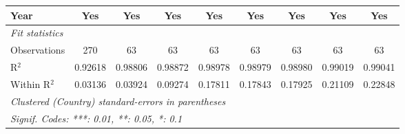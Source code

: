 \begin{table}[htbp]
\begin{tabular}{lcccccccc}
      Year                                                      & Yes             & Yes      & Yes      & Yes            & Yes            & Yes            & Yes            & Yes\\  
      \midrule
      \emph{Fit statistics}\\
      Observations                                              & 270             & 63       & 63       & 63             & 63             & 63             & 63             & 63\\  
      R$^2$                                                     & 0.92618         & 0.98806  & 0.98872  & 0.98978        & 0.98979        & 0.98980        & 0.99019        & 0.99041\\  
      Within R$^2$                                              & 0.03136         & 0.03924  & 0.09274  & 0.17811        & 0.17843        & 0.17925        & 0.21109        & 0.22848\\  
      \midrule \midrule
      \multicolumn{9}{l}{\emph{Clustered (Country) standard-errors in parentheses}}\\
      \multicolumn{9}{l}{\emph{Signif. Codes: ***: 0.01, **: 0.05, *: 0.1}}\\
   \end{tabular}
\end{table}


